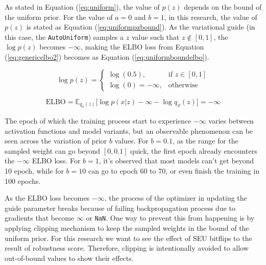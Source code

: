 \documentclass[ %
                    author={Revalda Putawara},
                supervisor={Dr. James Pope},
                    degree={MSc},
                     title={Robustness of Bayesian Neural Networks Design Choices Against Weight and Bias Perturbation Induced by Single Event Upsets (SEUs)},
                      type={},
                      year={2025}]{dissertation}
\begin{document}
As stated in Equation (\ref{eq:uniform}), the value of $p(z)$ depends on the bound of the uniform prior. For the value of $a=0$ and $b=1$, in this research, the value of $p(z)$ is stated as Equation (\ref{eq:uniformpzbound}). As the variational guide (in this case, the \texttt{AutoUniform}) samples a $z$ value such that $z \notin [0,1]$, the $\log p(z)$ becomes $-\infty$, making the ELBO loss from Equation (\ref{eq:genericelbo2}) becomes as Equation (\ref{eq:uniformboundelbo}).


\noindent
\begin{minipage}{0.48\linewidth}
\begin{equation}
\log p(z) =
\begin{cases}
\log(0.5), & \text{if } z \in [0, 1] \\
\log(0) = -\infty, & \text{otherwise}
\end{cases}
\label{eq:uniformpzbound}
\end{equation}
\end{minipage}\hfill
\begin{minipage}{0.48\linewidth}
\begin{equation}
\text{ELBO} = \mathbb{E}_{q_\phi(z)} \big[ \log p(x|z) -\infty  - \log q_\phi(z) \big] = -\infty
\label{eq:uniformboundelbo}
\end{equation}
\end{minipage}

The epoch of which the training process start to experience $-\infty$ varies between activation functions and model variants, but an observable phenomenon can be seen across the variation of prior $b$ values. For $b=0.1$, as the range for the sampled weight can go beyond $[0,0.1]$ quick, the first epoch already encounters the $-\infty$ ELBO loss. For $b=1$, it's observed that most models can't get beyond 10 epoch, while for $b=10$ can go to epoch 60 to 70, or even finish the training in 100 epochs.

As the ELBO loss becomes $-\infty$, the process of the optimizer in updating the guide parameter breaks because of failing backpropagation process due to gradients that become $\infty$ or \texttt{NaN}. One way to prevent this from happening is by applying clipping mechanism to keep the sampled weights in the bound of the uniform prior. For this research we want to see the effect of SEU bitflips to the result of robustness score. Therefore, clipping is intentionally avoided to allow out-of-bound values to show their effects.
\end{document}
